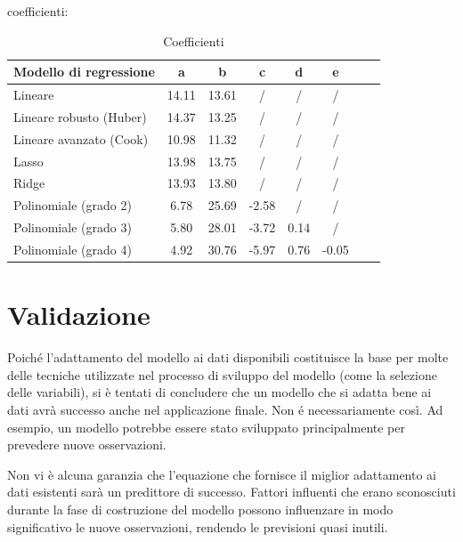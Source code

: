 coefficienti:

\begin{table}[H]
    \footnotesize
    \centering
    \begin{tabular}{|l|c|c|c|c|c|c|c|}
    \hline
        \textbf{Modello di regressione} & \textbf{a} & \textbf{b} & \textbf{c} & \textbf{d} & \textbf{e} \\ \hline
        Lineare & 14.11 & 13.61 & / & / & / \\ \hline
        Lineare robusto (Huber) & 14.37 & 13.25 & / & / & / \\ \hline
        Lineare avanzato (Cook) & 10.98 & 11.32 & / & / & / \\ \hline
        Lasso & 13.98 & 13.75 & / & / & / \\ \hline
        Ridge & 13.93 & 13.80 & / & / & / \\ \hline
        Polinomiale (grado 2) & 6.78 & 25.69 & -2.58 & / & / \\ \hline
        Polinomiale (grado 3) & 5.80 & 28.01 & -3.72 & 0.14 & / \\ \hline
        Polinomiale (grado 4) & 4.92 & 30.76 & -5.97 & 0.76 & -0.05 \\ \hline
    \end{tabular}
    \caption{Coefficienti}
    \label{fig:risultati-pm10-coefficienti}
\end{table}


\section{Validazione}\label{sec:validazione}

Poiché l'adattamento del modello ai dati disponibili costituisce la base per molte delle tecniche utilizzate nel processo di sviluppo del modello (come la selezione delle variabili), si è tentati di concludere che un modello che si adatta bene ai dati avrà successo anche nel applicazione finale. Non é necessariamente così. Ad esempio, un modello potrebbe essere stato sviluppato principalmente per prevedere nuove osservazioni.

Non vi è alcuna garanzia che l'equazione che fornisce il miglior adattamento ai dati esistenti sarà un predittore di successo. Fattori influenti che erano sconosciuti durante la fase di costruzione del modello possono influenzare in modo significativo le nuove osservazioni, rendendo le previsioni quasi inutili.

